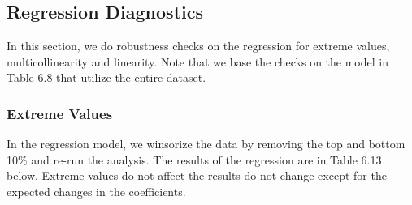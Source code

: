 \documentclass[a4paper, nobind]{templates/ociamthesis}
\begin{document}
\hypertarget{regression-diagnostics-1}{%
\subsection{Regression Diagnostics}\label{regression-diagnostics-1}}

In this section, we do robustness checks on the regression for extreme values, multicollinearity and linearity. Note that we base the checks on the model in Table 6.8 that utilize the entire dataset.

\hypertarget{extreme-values-1}{%
\subsubsection{Extreme Values}\label{extreme-values-1}}

In the regression model, we winsorize the data by removing the top and bottom 10\% and re-run the analysis. The results of the regression are in Table 6.13 below. Extreme values do not affect the results do not change except for the expected changes in the coefficients.
\end{document}
